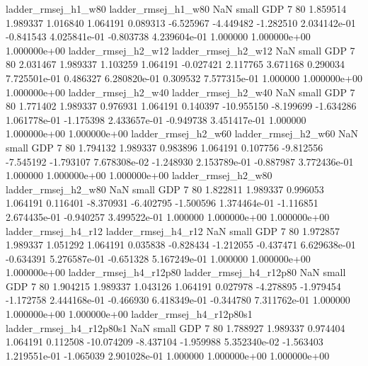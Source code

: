      ladder_rmsej_h1_w80      ladder_rmsej_h1_w80                   NaN      small      GDP                 7 80 1.859514       1.989337 1.016840       1.064191    0.089313     -6.525967     -4.449482    -1.282510   2.034142e-01 -0.841543 4.025841e-01    -0.803738   4.239604e-01            1.000000    1.000000e+00        1.000000e+00
     ladder_rmsej_h2_w12      ladder_rmsej_h2_w12                   NaN      small      GDP                 7 80 2.031467       1.989337 1.103259       1.064191   -0.027421      2.117765      3.671168     0.290034   7.725501e-01  0.486327 6.280820e-01     0.309532   7.577315e-01            1.000000    1.000000e+00        1.000000e+00
     ladder_rmsej_h2_w40      ladder_rmsej_h2_w40                   NaN      small      GDP                 7 80 1.771402       1.989337 0.976931       1.064191    0.140397    -10.955150     -8.199699    -1.634286   1.061778e-01 -1.175398 2.433657e-01    -0.949738   3.451417e-01            1.000000    1.000000e+00        1.000000e+00
     ladder_rmsej_h2_w60      ladder_rmsej_h2_w60                   NaN      small      GDP                 7 80 1.794132       1.989337 0.983896       1.064191    0.107756     -9.812556     -7.545192    -1.793107   7.678308e-02 -1.248930 2.153789e-01    -0.887987   3.772436e-01            1.000000    1.000000e+00        1.000000e+00
     ladder_rmsej_h2_w80      ladder_rmsej_h2_w80                   NaN      small      GDP                 7 80 1.822811       1.989337 0.996053       1.064191    0.116401     -8.370931     -6.402795    -1.500596   1.374464e-01 -1.116851 2.674435e-01    -0.940257   3.499522e-01            1.000000    1.000000e+00        1.000000e+00
     ladder_rmsej_h4_r12      ladder_rmsej_h4_r12                   NaN      small      GDP                 7 80 1.972857       1.989337 1.051292       1.064191    0.035838     -0.828434     -1.212055    -0.437471   6.629638e-01 -0.634391 5.276587e-01    -0.651328   5.167249e-01            1.000000    1.000000e+00        1.000000e+00
  ladder_rmsej_h4_r12p80   ladder_rmsej_h4_r12p80                   NaN      small      GDP                 7 80 1.904215       1.989337 1.043126       1.064191    0.027978     -4.278895     -1.979454    -1.172758   2.444168e-01 -0.466930 6.418349e-01    -0.344780   7.311762e-01            1.000000    1.000000e+00        1.000000e+00
ladder_rmsej_h4_r12p80s1 ladder_rmsej_h4_r12p80s1                   NaN      small      GDP                 7 80 1.788927       1.989337 0.974404       1.064191    0.112508    -10.074209     -8.437104    -1.959988   5.352340e-02 -1.563403 1.219551e-01    -1.065039   2.901028e-01            1.000000    1.000000e+00        1.000000e+00
